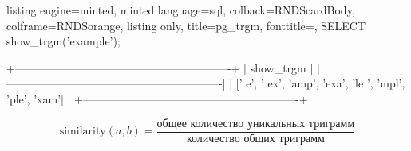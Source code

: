 \begin{frame}[fragile, t]
    \begin{tcblisting}{
      listing engine=minted,
      minted language=sql,
      colback=RNDScardBody,
      colframe=RNDSorange,
      listing only,
      title=pg\_trgm,
      fonttitle=\normalsize,
    }
SELECT show_trgm('example');

+----------------------------------------------------------+
| show_trgm                                                |
|----------------------------------------------------------|
| ['  e', ' ex', 'amp', 'exa', 'le ', 'mpl', 'ple', 'xam'] |
+----------------------------------------------------------+ 
  \end{tcblisting}

  \begin{equation}
    \text{similarity}(a,b) = \frac{\text{общее количество уникальных триграмм}}{\text{количество общих триграмм}}
  \end{equation}
\end{frame}
